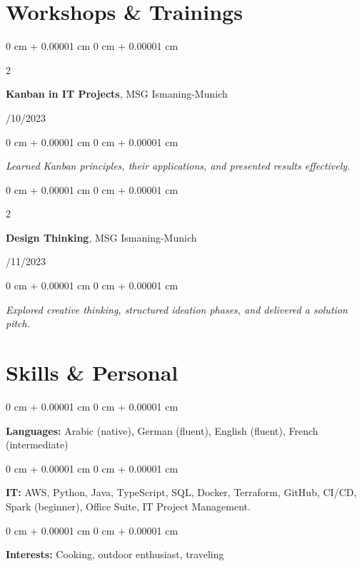 \documentclass[10pt, letterpaper]{article}
\newenvironment{onecolentry}{
    \begin{adjustwidth}{
        0 cm + 0.00001 cm
    }{
        0 cm + 0.00001 cm
    }
}{
    \end{adjustwidth}
} %
\newenvironment{twocolentry}[2][]{
    \onecolentry
    \def\secondColumn{#2}
    \setcolumnwidth{\fill, 4.5 cm}
    \begin{paracol}{2}
}{
    \switchcolumn \raggedleft \secondColumn
    \end{paracol}
    \endonecolentry
} %
\begin{document}
\vspace{0.2 cm}
        \vspace{0.2 cm}

     
    \section{Workshops \& Trainings}
\begin{twocolentry}{11/10/2023}
\textbf{Kanban in IT Projects}, MSG Ismaning-Munich
\end{twocolentry}
\begin{onecolentry}
\textit{Learned Kanban principles, their applications, and presented results effectively.}
\end{onecolentry}

\vspace{0.2cm}
\begin{twocolentry}{03/11/2023}
\textbf{Design Thinking}, MSG Ismaning-Munich
\end{twocolentry}
\begin{onecolentry}
\textit{Explored creative thinking, structured ideation phases, and delivered a solution pitch.}
\end{onecolentry}    
 \section{Skills \& Personal}

\begin{onecolentry}
\textbf{Languages:} Arabic (native), German (fluent), English (fluent), French (intermediate)
\end{onecolentry}
\vspace{0.1cm}
\begin{onecolentry}
\textbf{IT:} AWS, Python, Java, TypeScript, SQL, Docker, Terraform, GitHub, CI/CD, Spark (beginner), Office Suite, IT Project Management.
\end{onecolentry}
\vspace{0.1cm}
\begin{onecolentry}
\textbf{Interests:} Cooking, outdoor enthusiast, traveling
\end{onecolentry}


    
\end{document}
